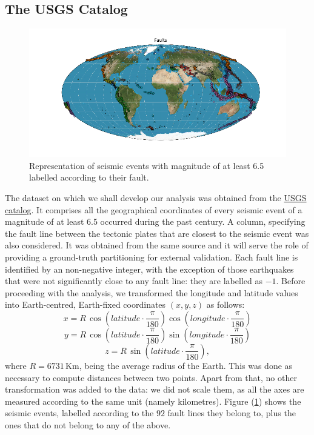 \documentclass[a4paper]{article}
\begin{document}
	\subsection{The USGS Catalog}
	\begin{figure}
	\includegraphics[width=\linewidth]{Faults.png}
	\caption{Representation of seismic events with magnitude of at least 6.5 labelled according to their fault.}
	\label{fig:fault}
	\end{figure}
	The dataset on which we shall develop our analysis was obtained from the \href{https://earthquake.usgs.gov/earthquakes/search/}{USGS catalog}. It comprises all the geographical coordinates of every seismic event of a magnitude of at least 6.5 occurred during the past century. A column, specifying the fault line between the tectonic plates that are closest to the seismic event was also considered. It was obtained from the same source and it will serve the role of providing a ground-truth partitioning for external validation. Each fault line is identified by an non-negative integer, with the exception of those earthquakes that were not significantly close to any fault line: they are labelled as $-1$.
	Before proceeding with the analysis, we transformed the longitude and latitude values into Earth-centred, Earth-fixed coordinates $\left(x,y,z\right)$ as follows:
	\begin{equation*}
	x = R \, \cos\left(latitude \cdot \frac{\pi}{180}\right) \cos\left(longitude \cdot \frac{\pi}{180} \right)
	\end{equation*}
	\begin{equation*}
	y = R \, \cos\left(latitude \cdot \frac{\pi}{180}\right) \sin\left(longitude \cdot \frac{\pi}{180} \right)
	\end{equation*}
	\begin{equation*}
	z = R \, \sin\left(latitude \cdot \frac{\pi}{180}\right),
	\end{equation*}
	where $R = 6731 \, \mathrm{Km}$, being the average radius of the Earth. This was done as necessary to compute distances between two points.
	Apart from that, no other transformation was added to the data: we did not scale them, as all the axes are measured according to the same unit (namely kilometres).
	Figure (\ref{fig:fault}) shows the seismic events, labelled according to the $92$ fault lines they belong to, plus the ones that do not belong to any of the above.
\end{document}
